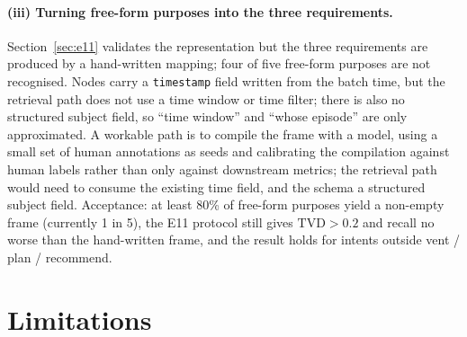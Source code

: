 \documentclass[11pt]{article}
\begin{document}
\paragraph{(iii) Turning free-form purposes into the three requirements.}
Section~\ref{sec:e11} validates the representation but the three requirements are produced by a
hand-written mapping; four of five free-form purposes are not recognised. Nodes carry a
\texttt{timestamp} field written from the batch time, but the retrieval path does not use a time
window or time filter; there is also no structured subject field, so ``time window'' and ``whose
episode'' are only approximated. A workable path is to compile the frame with a model, using a
small set of human annotations as seeds and calibrating the compilation against human labels
rather than only against downstream metrics; the retrieval path would need to consume the
existing time field, and the schema a structured subject field.
Acceptance: at least 80\% of free-form purposes yield a non-empty frame (currently 1 in 5), the
E11 protocol still gives $\mathrm{TVD}>0.2$ and recall no worse than the hand-written frame, and
the result holds for intents outside vent / plan / recommend.

\section{Limitations}
\label{sec:limitations}
\end{document}
